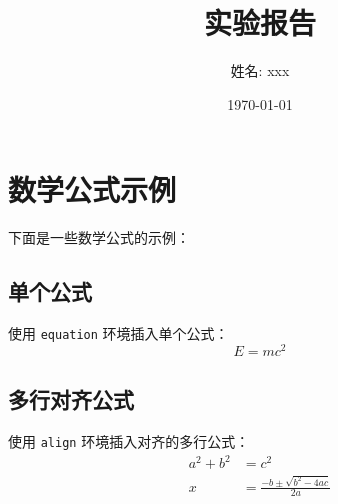 \documentclass[12pt]{article}
\title{实验报告}
\author{姓名: xxx}
\date{\today}  %
\begin{document}
\maketitle  %

\section{数学公式示例}

下面是一些数学公式的示例：

\subsection{单个公式}
使用 \texttt{equation} 环境插入单个公式：
\begin{equation}
E = mc^2
\end{equation}

\subsection{多行对齐公式}
使用 \texttt{align} 环境插入对齐的多行公式：
\begin{align}
a^2 + b^2 &= c^2 \\
x &= \frac{-b \pm \sqrt{b^2 - 4ac}}{2a}
\end{align}
\end{document}
